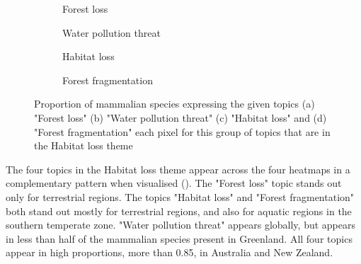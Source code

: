 \begin{figure}[!htbp]
    \centering
        \begin{subfigure}[t]{0.49\textwidth}
        \centering
        \caption{Forest loss}
        
        \label{subfig:for los}
        \end{subfigure}
        \begin{subfigure}[t]{0.49\textwidth}
        \centering
        \caption{Water pollution threat}
        
        \label{subfig:wat pol}
        \end{subfigure}
        \begin{subfigure}[t]{0.49\textwidth}
        \centering
        \caption{Habitat loss}
        
        \label{subfig:hab los}
        \end{subfigure}
        \begin{subfigure}[t]{0.49\textwidth}
        \centering
        \caption{Forest fragmentation}
        
        \label{subfig:for fra}
        \end{subfigure}
    \caption{Proportion of mammalian species expressing the given topics (a) "Forest loss" (b) "Water pollution threat" (c) "Habitat loss" and (d) "Forest fragmentation" each pixel for this group of topics that are in the Habitat loss theme}
    \label{fig:hab los theme}
\end{figure}
\FloatBarrier

The four topics in the Habitat loss theme appear across the four heatmaps in a complementary pattern when visualised (). The "Forest loss" topic stands out only for terrestrial regions. The topics "Habitat loss" and "Forest fragmentation" both stand out mostly for terrestrial regions, and also for aquatic regions in the southern temperate zone. "Water pollution threat" appears globally, but appears in less than half of the mammalian species present in Greenland. All four topics appear in high proportions, more than 0.85, in Australia and New Zealand.

